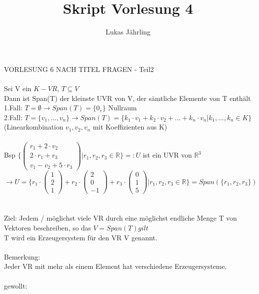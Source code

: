 \documentclass{scrartcl}
\title{Skript Vorlesung 4}
\author{Lukas Jährling}
\begin{document}
	\large
	VORLESUNG 6 NACH TITEL FRAGEN - Teil2
	\normalsize
	\\
	\\
	Sei V ein $K-VR$, $T \subseteq V$ \\
	Dann ist Span(T) der kleinste UVR von V, der sämtliche Elemente von T enthält\\
	1.Fall: $T=\emptyset \rightarrow Span(T) = \{ 0_v  \}$ Nullraum\\
	2.Fall: $T = \{ v_1, ... , v_n      \} \rightarrow Span(T) = \{ k_1 \cdot v_1 + k_2 \cdot v_2 + ... + k_n \cdot v_n  \vert k_1,..., k_n \in K    \}$ \\
	(Linearkombination $v_1,v_2, v_n$ mit Koeffizienten aus K)\\ \\
	Bsp
	$\{
	\begin{pmatrix}
	r_1 + 2\cdot v_2 \\ 2 \cdot r_1 + r_3 \\ v_1 - v_2 + 5\cdot r_3	
	\end{pmatrix} \vert r_1, r_2, r_3 \in \mathbb{R}
	\} =: U$ ist ein UVR von $\mathbb{R}^3$\\
	$\rightarrow U=\{  r_1 \cdot \begin{pmatrix}
	1 \\ 2 \\ 1
	\end{pmatrix} + r_2 \cdot \begin{pmatrix}
	2 \\ 0 \\ -1
	\end{pmatrix} + r_3 \cdot \begin{pmatrix}
	0 \\ 1 \\ 5
	\end{pmatrix} \vert r_1, r_2, r_3 \in \mathbb{R}      \} = Span(\{ r_1, r_2, r_3    \})  $	\\
	\\\\
	Ziel: Jedem / möglichst viele VR durch eine möglichst endliche Menge T von Vektoren beschreiben, so das $V = Span(T) gilt$ \\ 
	T wird ein Erzeugersystem für den VR V genannt. \\ \\
	Bemerkung:\\
	Jeder VR mit mehr als einem Element hat verschiedene Erzeugersysteme.\\ \\
	gewollt:\\
\end{document}
